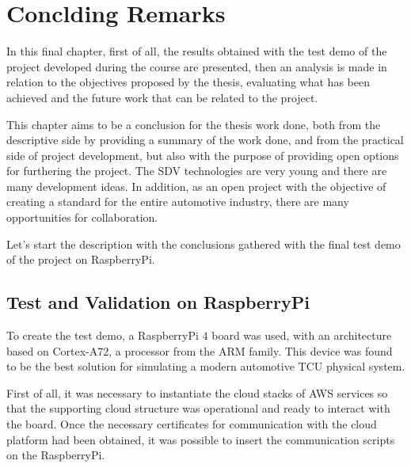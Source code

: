 \chapter{Conclding Remarks} \label{ch:concldingRemarks}
In this final chapter, first of all, the results obtained with the test demo of the project developed during the course are presented, then an analysis is made in relation to the objectives proposed by the thesis, evaluating what has been achieved and the future work that can be related to the project.

This chapter aims to be a conclusion for the thesis work done, both from the descriptive side by providing a summary of the work done, and from the practical side of project development, but also with the purpose of providing open options for furthering the project. The SDV technologies are very young and there are many development ideas. In addition, as an open project with the objective of creating a standard for the entire automotive industry, there are many opportunities for collaboration.

Let's start the description with the conclusions gathered with the final test demo of the project on RaspberryPi.

\section{Test and Validation on RaspberryPi}
To create the test demo, a RaspberryPi 4 board was used, with an architecture based on Cortex-A72, a processor from the ARM family. This device was found to be the best solution for simulating a modern automotive TCU physical system.

First of all, it was necessary to instantiate the cloud stacks of AWS services so that the supporting cloud structure was operational and ready to interact with the board. Once the necessary certificates for communication with the cloud platform had been obtained, it was possible to insert the communication scripts on the RaspberryPi.

